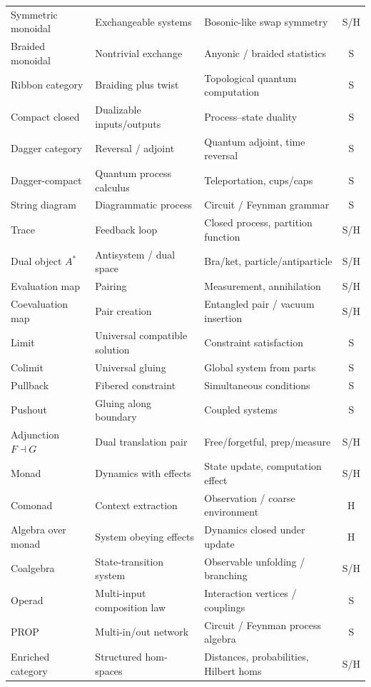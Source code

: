 \documentclass[12pt]{article}
\theoremstyle{definition}
\theoremstyle{remark}
\begin{document}
\begin{longtable}{@{}L{3.9cm}L{4.3cm}L{3.2cm}c@{}}
Symmetric monoidal & Exchangeable systems & Bosonic-like swap symmetry & S/H\\
Braided monoidal & Nontrivial exchange & Anyonic / braided statistics & S\\
Ribbon category & Braiding plus twist & Topological quantum computation & S\\
Compact closed & Dualizable inputs/outputs & Process--state duality & S\\
Dagger category & Reversal / adjoint & Quantum adjoint, time reversal & S\\
Dagger-compact & Quantum process calculus & Teleportation, cups/caps & S\\
String diagram & Diagrammatic process & Circuit / Feynman grammar & S\\
Trace & Feedback loop & Closed process, partition function & S/H\\
Dual object $A^{*}$ & Antisystem / dual space & Bra/ket, particle/antiparticle & S/H\\
Evaluation map & Pairing & Measurement, annihilation & S/H\\
Coevaluation map & Pair creation & Entangled pair / vacuum insertion & S/H\\
Limit & Universal compatible solution & Constraint satisfaction & S\\
Colimit & Universal gluing & Global system from parts & S\\
Pullback & Fibered constraint & Simultaneous conditions & S\\
Pushout & Gluing along boundary & Coupled systems & S\\
Adjunction $F\dashv G$ & Dual translation pair & Free/forgetful, prep/measure & S/H\\
Monad & Dynamics with effects & State update, computation effect & S/H\\
Comonad & Context extraction & Observation / coarse environment & H\\
Algebra over monad & System obeying effects & Dynamics closed under update & H\\
Coalgebra & State-transition system & Observable unfolding / branching & S/H\\
Operad & Multi-input composition law & Interaction vertices / couplings & S\\
PROP & Multi-in/out network & Circuit / Feynman process algebra & S\\
Enriched category & Structured hom-spaces & Distances, probabilities, Hilbert homs & S/H\\

\end{longtable}
\end{document}
